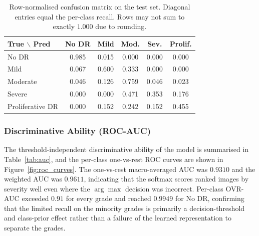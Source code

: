 \begin{table}[H]
\centering
\caption{Row-normalised confusion matrix on the test set. Diagonal entries equal
the per-class recall. Rows may not sum to exactly $1.000$ due to rounding.}
\label{tab:confusion_norm}
\begin{tabular}{lccccc}
\toprule
True $\backslash$ Pred & No DR & Mild & Mod. & Sev. & Prolif. \\
\midrule
No DR            & 0.985 & 0.015 & 0.000 & 0.000 & 0.000 \\
Mild             & 0.067 & 0.600 & 0.333 & 0.000 & 0.000 \\
Moderate         & 0.046 & 0.126 & 0.759 & 0.046 & 0.023 \\
Severe           & 0.000 & 0.000 & 0.471 & 0.353 & 0.176 \\
Proliferative DR & 0.000 & 0.152 & 0.242 & 0.152 & 0.455 \\
\bottomrule
\end{tabular}
\end{table}


\subsubsection{Discriminative Ability (ROC-AUC)}
\label{subsubsec:auc}

The threshold-independent discriminative ability of the model is summarised in
Table~\ref{tab:auc}, and the per-class one-vs-rest ROC curves are shown in
Figure~\ref{fig:roc_curves}. The one-vs-rest macro-averaged AUC was $0.9310$ and the
weighted AUC was $0.9611$, indicating that the softmax scores ranked images by
severity well even where the $\arg\max$ decision was incorrect. Per-class OVR-AUC
exceeded $0.91$ for every grade and reached $0.9949$ for No DR, confirming that the
limited recall on the minority grades is primarily a decision-threshold and
class-prior effect rather than a failure of the learned representation to separate
the grades.

